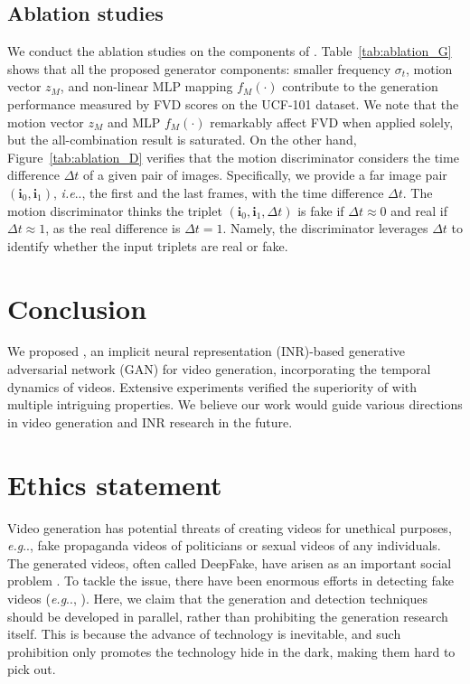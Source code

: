 \documentclass{article} \usepackage{iclr2022_conference,times}
\makeatletter
\DeclareRobustCommand\onedot{\futurelet\@let@token\@onedot}
\def\@onedot{\ifx\@let@token.\else.\null\fi\xspace}
\def\eg{\emph{e.g}\onedot} \def\Eg{\emph{E.g}\onedot}
\def\ie{\emph{i.e}\onedot} \def\Ie{\emph{I.e}\onedot}
\makeatother
\begin{document}
 
\vspace{-0.07in}
\subsection{Ablation studies}
\vspace{-0.01in}
\label{subsec:exp-ablation}

We conduct the ablation studies on the components of \sname. Table~\ref{tab:ablation_G} shows that all the proposed generator components: smaller frequency $\sigma_t$, motion vector $z_M$, and non-linear MLP mapping $f_M(\cdot)$ contribute to the generation performance measured by FVD scores on the UCF-101 dataset. We note that the motion vector $z_M$ and MLP $f_M(\cdot)$ remarkably affect FVD when applied solely, but the all-combination result is saturated. On the other hand, Figure~\ref{tab:ablation_D} verifies that the motion discriminator considers the time difference $\Delta t$ of a given pair of images. Specifically, we provide a far image pair $(\bm{i}_0,\bm{i}_1)$, \ie, the first and the last frames, with the time difference $\Delta t$. The motion discriminator thinks the triplet $(\bm{i}_0,\bm{i}_1,\Delta t)$ is fake if $\Delta t \approx 0$ and real if $\Delta t \approx 1$, as the real difference is $\Delta t = 1$. Namely, the discriminator leverages $\Delta t$ to identify whether the input triplets are real or fake.


\vspace{-0.1in}
\section{Conclusion}
\vspace{-0.05in}

We proposed \sname, an implicit neural representation (INR)-based generative adversarial network (GAN) for video generation, incorporating the temporal dynamics of videos. Extensive experiments verified the superiority of \sname with multiple intriguing properties. We believe our work would guide various directions in video generation and INR research in the future.

\section*{Ethics statement}

Video generation has potential threats of creating videos for unethical purposes, \eg, fake propaganda videos of politicians or sexual videos of any individuals. The generated videos, often called DeepFake, have arisen as an important social problem \citep{mika2019emergence}. To tackle the issue, there have been enormous efforts in detecting fake videos (\eg, \citet{guera2018deepfake}). Here, we claim that the generation and detection techniques should be developed in parallel, rather than prohibiting the generation research itself. This is because the advance of technology is inevitable, and such prohibition only promotes the technology hide in the dark, making them hard to pick out.
\end{document}
